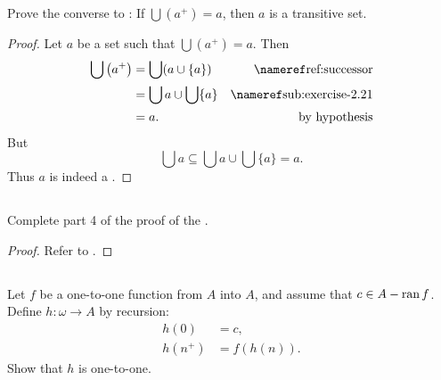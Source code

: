 \documentclass{report}
\begin{document}
\subsection{}%

Prove the converse to : If
  $\bigcup \left(a^+\right) = a$, then $a$ is a transitive set.

\begin{proof}

  Let $a$ be a set such that $\bigcup \left(a^+\right) = a$.
  Then
    \begin{align*}
      \bigcup \left(a^+\right)
        & = \bigcup (a \cup \{a\}) & \textref{ref:successor} \\
        & = \bigcup a \cup \bigcup \{a\} & \textref{sub:exercise-2.21} \\
        & = a. & \text{by hypothesis}
    \end{align*}
  But $$\bigcup{a} \subseteq \bigcup a \cup \bigcup \{a\} = a.$$
  Thus $a$ is indeed a .

\end{proof}

\subsection{}%

Complete part 4 of the proof of the
  .

\begin{proof}

  Refer to .

\end{proof}

\subsection{}%

Let $f$ be a one-to-one function from $A$ into $A$, and assume that
  $c \in A - \mathop{\text{ran}}{f}$.
Define $h \colon \omega \rightarrow A$ by recursion:
  \begin{align*}
    h(0) & = c, \\
    h(n^+) & = f(h(n)).
  \end{align*}
Show that $h$ is one-to-one.
\end{document}
